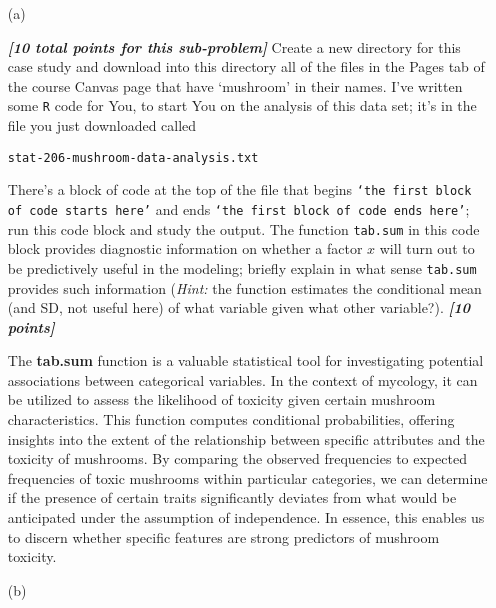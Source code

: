 \documentclass[12pt]{article}
\newcommand{\bi}[1]{\b{\i{#1}}}
\renewcommand{\b}[1]{\textbf{#1}}
\renewcommand{\i}[1]{\textit{#1}}
\begin{document}
\begin{itemize}

\item[(a)]

\bi{[10 total points for this sub-problem]} Create a new directory for this case study and download into this directory all of the files in the Pages tab of the course Canvas page that have `mushroom' in their names. I've written some \texttt{R} code for You, to start You on the analysis of this data set; it's in the file you just downloaded called

\hspace*{1.0in} \texttt{stat-206-mushroom-data-analysis.txt}

There's a block of code at the top of the file that begins \texttt{`the first block of code starts here'} and ends \texttt{`the first block of code ends here'}; run this code block and study the output. The function \texttt{tab.sum} in this code block provides diagnostic information on whether a factor $x$ will turn out to be predictively useful in the modeling; briefly explain in what sense \texttt{tab.sum} provides such information (\textit{Hint:} the function estimates the conditional mean (and SD, not useful here) of what variable given what other variable?). \bi{[10 points]}

{\color{blue}
The \textbf{tab.sum} function is a valuable statistical tool for investigating potential associations between categorical variables. In the context of mycology, it can be utilized to assess the likelihood of toxicity given certain mushroom characteristics. This function computes conditional probabilities, offering insights into the extent of the relationship between specific attributes and the toxicity of mushrooms. By comparing the observed frequencies to expected frequencies of toxic mushrooms within particular categories, we can determine if the presence of certain traits significantly deviates from what would be anticipated under the assumption of independence. In essence, this enables us to discern whether specific features are strong predictors of mushroom toxicity.
}


\item[(b)]


\end{itemize}
\end{document}
